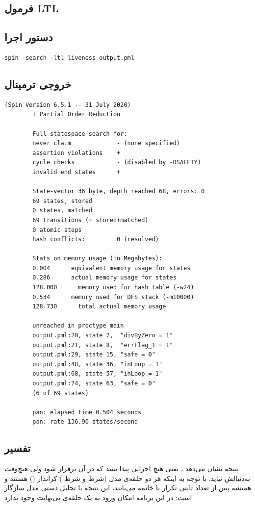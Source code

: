\documentclass[12pt,a4paper]{article}
\newcommand{\ltlbox}[1]{%
	\begin{center}
		\fbox{\parbox{0.9\linewidth}{\centering $#1$}}
	\end{center}
}
\begin{document}
\subsection{فرمول LTL}
\ltlbox{\square\,(\mathit{inLoop} \rightarrow \Diamond\, \mathit{exitLoop})}

\subsection{دستور اجرا}
\begin{latin}
	\begin{lstlisting}[style=codestyle]
		spin -search -ltl liveness output.pml
	\end{lstlisting}
\end{latin}

\subsection{خروجی ترمینال}
\begin{latin}
	\begin{lstlisting}[style=termstyle]
		(Spin Version 6.5.1 -- 31 July 2020)
		+ Partial Order Reduction
		
		Full statespace search for:
		never claim             - (none specified)
		assertion violations    +
		cycle checks            - (disabled by -DSAFETY)
		invalid end states      +
		
		State-vector 36 byte, depth reached 68, errors: 0
		69 states, stored
		0 states, matched
		69 transitions (= stored+matched)
		0 atomic steps
		hash conflicts:         0 (resolved)
		
		Stats on memory usage (in Megabytes):
		0.004      equivalent memory usage for states
		0.286      actual memory usage for states
		128.000      memory used for hash table (-w24)
		0.534      memory used for DFS stack (-m10000)
		128.730      total actual memory usage
		
		unreached in proctype main
		output.pml:20, state 7,  "divByZero = 1"
		output.pml:21, state 8,  "errFlag_1 = 1"
		output.pml:29, state 15, "safe = 0"
		output.pml:48, state 36, "inLoop = 1"
		output.pml:68, state 57, "inLoop = 1"
		output.pml:74, state 63, "safe = 0"
		(6 of 69 states)
		
		pan: elapsed time 0.504 seconds
		pan: rate 136.90 states/second
	\end{lstlisting}
\end{latin}

\subsection{تفسیر}	نتیجه نشان می‌دهد ، یعنی هیچ اجرایی پیدا نشد که در آن  برقرار شود ولی  هیچ‌وقت به‌دنبالش نیاید. با توجه به اینکه هر دو حلقه‌ی مدل (شرط  و شرط ) کراندار () هستند و همیشه پس از تعداد ثابتی تکرار با  خاتمه می‌یابند، این نتیجه با تحلیل دستی مدل سازگار است: در این برنامه امکان ورود به یک حلقه‌ی بی‌نهایت وجود ندارد.
	
\end{document}
